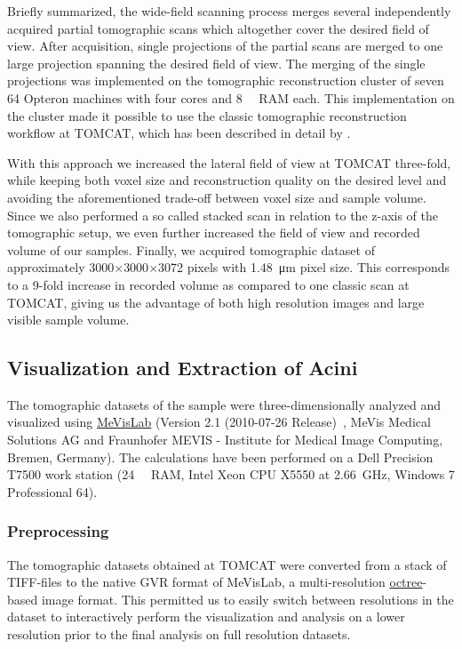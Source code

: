 \documentclass[%
	draft=true,
	paper=a4,%
	twoside=true,%
	abstract=true]{scrartcl}
\begin{document}
Briefly summarized, the wide-field scanning process merges several independently acquired partial tomographic scans which altogether cover the desired field of view. After acquisition, single projections of the partial scans are merged to one large projection spanning the desired field of view. The merging of the single projections was implemented on the tomographic reconstruction cluster of seven \SI{64}{\bit} Opteron machines with four cores and \SI{8}{\giga\byte} RAM each. This implementation on the cluster made it possible to use the classic tomographic reconstruction workflow at TOMCAT, which has been described in detail by \citet{Hintermueller2010}.

With this approach we increased the lateral field of view at TOMCAT three-fold, while keeping both voxel size and reconstruction quality on the desired level and avoiding the aforementioned trade-off between voxel size and sample volume. Since we also performed a so called stacked scan in relation to the z-axis of the tomographic setup, we even further increased the field of view and recorded volume of our samples. Finally, we acquired tomographic dataset of approximately 3000\(\times\)3000\(\times\)3072 pixels with \SI{1.48}{\micro\meter} pixel size. This corresponds to a 9-fold increase in recorded volume as compared to one classic scan at TOMCAT, giving us the advantage of both high resolution images and large visible sample volume.

\subsection{Visualization and Extraction of Acini}
The tomographic datasets of the sample were three-dimensionally analyzed and visualized using \href{http://mevislab.de}{MeVisLab} (Version 2.1 (2010-07-26 Release)~\cite{Bitter2007}, MeVis Medical Solutions AG and Fraunhofer MEVIS - Institute for Medical Image Computing, Bremen, Germany). The calculations have been performed on a Dell Precision T7500 work station (\SI{24}{\giga\byte} RAM, Intel Xeon CPU X5550 at \SI{2.66}{\giga\hertz}, Windows 7 Professional \SI{64}{\bit}).

\subsubsection{Preprocessing}
The tomographic datasets obtained at TOMCAT were converted from a stack of TIFF-files to the native GVR format of MeVisLab, a multi-resolution \href{https://secure.wikimedia.org/wikipedia/en/w/index.php?title=Octree&oldid=409131920}{octree}-based image format. This permitted us to easily switch between resolutions in the dataset to interactively perform the visualization and analysis on a lower resolution prior to the final analysis on full resolution datasets.
\end{document}
